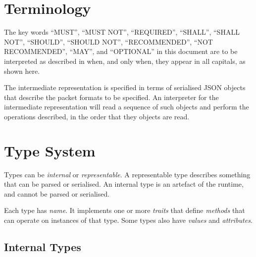 \documentclass[10pt,twocolumn,a4paper]{article}
\begin{document}


\section{Terminology}

The key words ``MUST'', ``MUST NOT'', ``REQUIRED'', ``SHALL'', ``SHALL
NOT'', ``SHOULD'', ``SHOULD NOT'', ``RECOMMENDED'', ``NOT RECOMMENDED'',
``MAY'', and ``OPTIONAL'' in this document are to be interpreted as
described in \cite{RFC2119,RFC8174} when, and only when, they appear
in all capitals, as shown here.



The intermediate representation is specified in terms of serialised JSON
\cite{RFC7159} objects that describe the packet formats to be specified.
An interpreter for the intermediate representation will read a sequence of
such objects and perform the operations described, in the order that they
objects are read.

\section{Type System}

Types can be \emph{internal} or \emph{representable}. A representable type
describes something that can be parsed or serialised. An internal type is
an artefact of the runtime, and cannot be parsed or serialised.

Each type has \emph{name}. It implements one or more \emph{traits} that
define \emph{methods} that can operate on instances of that type. Some
types also have \emph{values} and \emph{attributes}.

\subsection{Internal Types}



\end{document}
